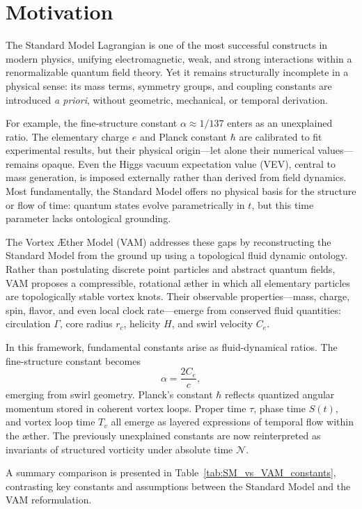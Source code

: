 \section{Motivation}

The Standard Model Lagrangian is one of the most successful constructs in modern physics, unifying electromagnetic, weak, and strong interactions within a renormalizable quantum field theory. Yet it remains structurally incomplete in a physical sense: its mass terms, symmetry groups, and coupling constants are introduced \textit{a priori}, without geometric, mechanical, or temporal derivation.

For example, the fine-structure constant $\alpha \approx 1/137$ enters as an unexplained ratio. The elementary charge $e$ and Planck constant $\hbar$ are calibrated to fit experimental results, but their physical origin—let alone their numerical values—remains opaque. Even the Higgs vacuum expectation value (VEV), central to mass generation, is imposed externally rather than derived from field dynamics. Most fundamentally, the Standard Model offers no physical basis for the structure or flow of time: quantum states evolve parametrically in $t$, but this time parameter lacks ontological grounding.

The Vortex Æther Model (VAM) addresses these gaps by reconstructing the Standard Model from the ground up using a topological fluid dynamic ontology. Rather than postulating discrete point particles and abstract quantum fields, VAM proposes a compressible, rotational æther in which all elementary particles are topologically stable vortex knots. Their observable properties—mass, charge, spin, flavor, and even local clock rate—emerge from conserved fluid quantities: circulation $\Gamma$, core radius $r_c$, helicity $H$, and swirl velocity $C_e$.

In this framework, fundamental constants arise as fluid-dynamical ratios. The fine-structure constant becomes
\[
\alpha = \frac{2C_e}{c},
\]
emerging from swirl geometry. Planck’s constant $\hbar$ reflects quantized angular momentum stored in coherent vortex loops. Proper time $\tau$, phase time $S(t)$, and vortex loop time $T_v$ all emerge as layered expressions of temporal flow within the æther. The previously unexplained constants are now reinterpreted as invariants of structured vorticity under absolute time $\mathcal{N}$.

A summary comparison is presented in Table~\ref{tab:SM_vs_VAM_constants}, contrasting key constants and assumptions between the Standard Model and the VAM reformulation.

